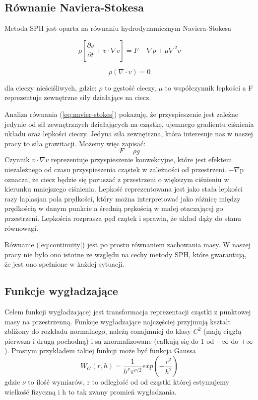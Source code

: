 \documentclass[polish, 12pt]{aghthesis}
\begin{document}
		\subsection{Równanie Naviera-Stokesa}

			Metoda SPH jest oparta na równaniu hydrodynamicznym Naviera-Stokesa

			\[{\rho}[\frac{\partial v}{\partial t} + v \cdot \nabla v ]= F - \nabla p + \mu \nabla^2 v \label{eq:navier-stokes} \tag{1}\]

			\[{\rho}(\nabla \cdot v)=0 \label{eq:continuity} \tag{2}\]

			dla cieczy nieściśliwych, gdzie: ${\rho}$ to gęstość cieczy, ${\mu}$ to współczynnik lepkości a F reprezentuje zewnętrzne siły działające na ciecz.
			
			Analiza równania (\ref{eq:navier-stokes}) pokazuję, że przyspieszenie jest zależne jedynie od sił zewnętrznych działających na cząstkę, ujemnego gradientu ciśnienia układu oraz lepkości cieczy. Jedyna siła zewnętrzna, która interesuje nas w naszej pracy to siła grawitacji. Możemy więc zapisać: \[F={\rho}g \label {eq:gravity_force} \tag{3} \] Czynnik $v {\cdot} {\nabla} v$ reprezentuje przyspieszenie konwekcyjne, które jest efektem niezależnego od czasu przyspieszenia cząstek w zależności od przestrzeni. $-{\nabla}$p oznacza, że ciecz będzie się poruszać z przestrzeni o większym ciśnieniu w kierunku mniejszego ciśnienia. Lepkość reprezentowana jest jako stała lepkości razy laplasjan pola prędkości, który można interpretować jako różnicę między prędkością w danym punkcie a średnią prękością w małej otaczającej go przestrzeni. Lepkościa rozprasza pęd czątek i sprawia, że układ dąży do stanu równowagi.
			
			Równanie (\ref{eq:continuity}) jest po prostu równaniem zachowania masy. W naszej pracy nie było ono istotne ze względu na cechy metody SPH, które gwarantują, że jest ono spełnione w każdej sytuacji.
			 
		\subsection{Funkcje wygładzające}
			
			Celem funkcji wygładzającej jest transformacja reprezentacji cząstki z punktowej masy na przestrzenną. Funkcje wygładzające najczęściej przyjmują kształt zbliżony do rozkładu normalnego, należą conajmniej do klasy ${C^2}$ (mają ciągłą pierwsza i drugą pochodną) i są znormalizowane (całkują się do 1 od $-{\infty}$ do $+{\infty}$). Prostym przykładem takiej funkcji może być funkcja Gaussa \[W_G(r,h)=\frac{1}{h^{\nu}\pi^{{\nu}/2}}exp(-\frac{r^2}{h^2}) \label{eq:gaussian} \tag{4}\] gdzie ${\nu}$ to ilość wymiarów, r to odległość od od cząstki której estymujemy wielkość fizyczną i h to tak zwany promień wygładzania.
			
\end{document}
